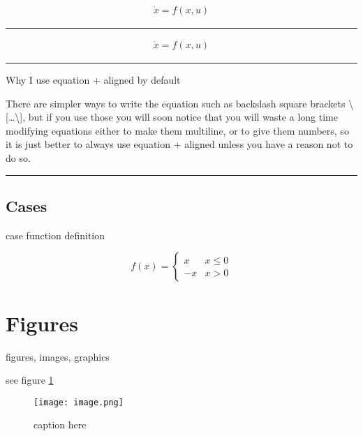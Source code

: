 \documentclass[12pt]{article}
\newcommand{\inOut}[1]{#1} %
\begin{document}
\begin{example} \label{expFor2}
  \inOut{
    \begin{equation}\begin{aligned}\label{eqFor2}
      \dot{x} = f(x,u)
    \end{aligned}\end{equation}
  }
\end{example}\hrule

\begin{example} \label{expFor1}
  \inOut{
    \begin{equation}\begin{aligned}\label{eqFor1}
      \dot{x} = f(x,u)
    \end{aligned}\end{equation}
  }
\end{example}\hrule

\begin{remark}\label{remFor1} Why I use equation + aligned by default

  There are simpler ways to write the equation such as backslash square brackets \textbackslash{}[\ldots\textbackslash{}],
  but if you use those you will soon notice that you will waste a long time modifying equations
  either to make them multiline, or to give them numbers, so it is just better to always use
  equation + aligned unless you have a reason not to do so.
\end{remark}\hrule

\subsection{Cases}\label{cases}

case function definition

\begin{equation}
f(x) =
\begin{cases}
  x & x \le 0 \\
  -x & x>0
\end{cases}
\end{equation}

\section{Figures}\label{secTab}

figures, images, graphics

see figure \ref{fig-label}

\begin{figure}[htb]
  \centering
  \texttt{[image: image.png]}
  \caption{caption here}
  \label{fig-label}
\end{figure}
\end{document}
